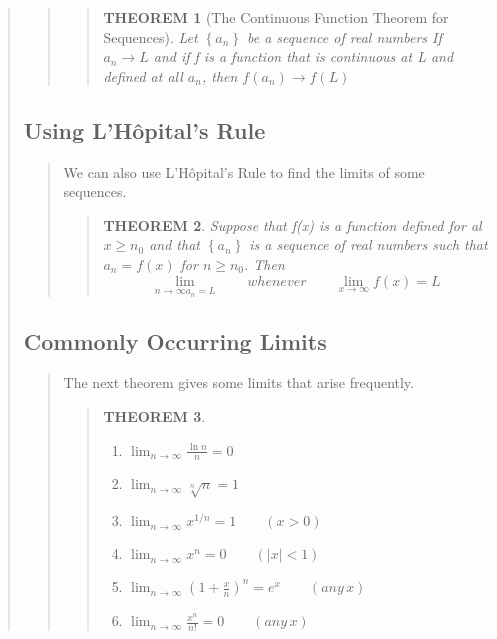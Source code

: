 \documentclass{report}
\newtheorem{theorem}{THEOREM}
\begin{document}
\begin{quote}
\begin{quote}
		\begin{quote}
			\begin{theorem}[The Continuous Function Theorem for Sequences]
				Let $\left\{a_n\right\}$ be a sequence of real numbers If $a_n \to L$ and if f is a function that is continuous at L and defined at all $a_n$, then $f(a_n)\to f(L)$
			\end{theorem}
		\end{quote}

	\end{quote}

	\subsection{Using L’Hôpital’s Rule}
	\begin{quote}

		We can also use  L’Hôpital’s Rule to find the limits of some sequences.

		\begin{quote}

			\begin{theorem}
				Suppose that f(x) is a function defined for al $x \geq n_0$ and that $\left\{a_n\right\}$ is a sequence of real numbers such that $a_n = f(x) $ for $n\geq n_0$. Then
				$$\lim_{n \to \infty a_n = L}\qquad whenever \qquad \lim_{x\to\infty} f(x) = L$$
			\end{theorem}
		
		\end{quote}

	\end{quote}

	\subsection{Commonly Occurring Limits}
	\begin{quote}

		The next theorem gives some limits that arise frequently.

		\begin{quote}
		\begin{theorem}
			\begin{enumerate}
				\item $\lim_{n \to \infty } \frac{\ln n}{n} = 0$
				\item $\lim_{n \to \infty }  \sqrt[n]{n} = 1$
				\item $\lim_{n \to \infty } x^{1/n}=1\qquad (x>0)$ 
				\item $\lim_{n \to \infty }  x^n = 0\qquad(\left | x \right | < 1)$
				\item $\lim_{n \to \infty } (1 + \frac{x}{n})^n = e^x\qquad (any\, x)$
				\item $\lim_{n \to \infty } \frac{x^n}{n!} = 0 \qquad (any\, x)$
			\end{enumerate}
		\end{theorem}
		\end{quote}


\end{quote}
\end{quote}
\end{document}
